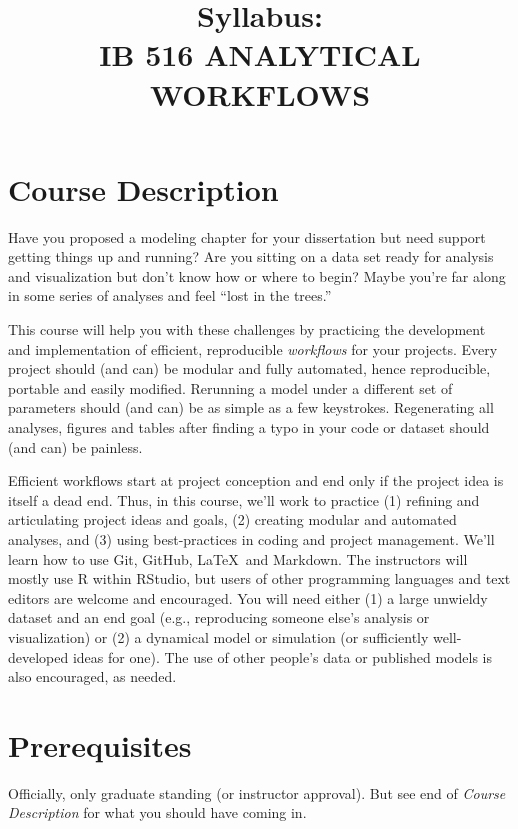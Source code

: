 \documentclass[10pt]{article}
\title{Syllabus:\\IB 516 ANALYTICAL WORKFLOWS}
\author{}
\date{}
\begin{document}
\maketitle
\vspace{-50pt}


\section*{Course Description}
	Have you proposed a modeling chapter for your dissertation but need support getting things up and
	running?
	Are you sitting on a data set ready for analysis and visualization but don't know how or
	where to begin?
	Maybe you're far along in some series of analyses and feel ``lost in the trees.''

	This course will help you with these challenges by practicing the development and implementation of
	efficient, reproducible \emph{workflows} for your projects.
	Every project should (and can) be modular and fully automated, hence reproducible, portable and
	easily modified.
	Rerunning a model under a different set of parameters should (and can) be as simple as a few
	keystrokes.
	Regenerating all analyses, figures and tables after finding a typo in your code or dataset should (and
	can) be painless.

	Efficient workflows start at project conception and end only if the project idea is itself a dead end.
	Thus, in this course, we'll work to practice
	(1) refining and articulating project ideas and goals,
	(2) creating modular and automated analyses, and
	(3) using best-practices in coding and project management.
	We'll learn how to use Git, GitHub, \LaTeX\, and Markdown.
	The instructors will mostly use \textsf{R} within RStudio, but users of other programming languages
	and text editors are welcome and encouraged.
	You will need either
	(1) a large unwieldy dataset and an end goal (e.g., reproducing someone else's analysis or
	visualization) or
	(2) a dynamical model or simulation (or sufficiently well-developed ideas for one).
	The use of other people's data or published models is also encouraged, as needed.

\section*{Prerequisites}
\noindent
	Officially, only graduate standing (or instructor approval).
	But see end of \emph{Course Description} for what you should have coming in.
\end{document}
